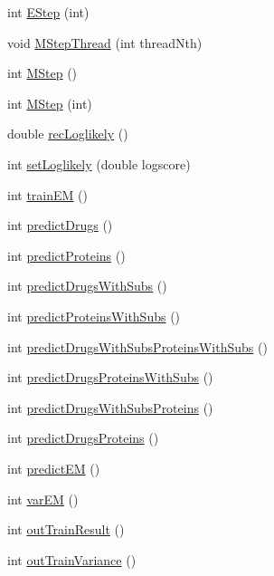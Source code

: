\begin{DoxyCompactItemize}
int \hyperlink{classgift_1_1_e_m_ac426be80fda5cc8ca36c58c6521b2325}{E\+Step} (int)
\item 
void \hyperlink{classgift_1_1_e_m_ab013e0f40fb11407d8c528ae6e34301c}{M\+Step\+Thread} (int thread\+Nth)
\item 
int \hyperlink{classgift_1_1_e_m_ab79cafeefe4ac1574990b83dfa02b762}{M\+Step} ()
\item 
int \hyperlink{classgift_1_1_e_m_aa380381fea7970d7470e40671a526a34}{M\+Step} (int)
\item 
double \hyperlink{classgift_1_1_e_m_a94cb6b1e0ee9c60c04356cd4061a6465}{rec\+Loglikely} ()
\item 
int \hyperlink{classgift_1_1_e_m_a5672958e550c66f7417ded6b846714b4}{set\+Loglikely} (double logscore)
\item 
int \hyperlink{classgift_1_1_e_m_a5a8d0678b14cb1429d37bb3ae7ca30e2}{train\+EM} ()
\item 
int \hyperlink{classgift_1_1_e_m_aed05c6829e19e981628d8a514a766cab}{predict\+Drugs} ()
\item 
int \hyperlink{classgift_1_1_e_m_aea459564b58b8f1322fb0d444ed49e7b}{predict\+Proteins} ()
\item 
int \hyperlink{classgift_1_1_e_m_a7f8463f4f7ff0acaf7e1195f5b4d58ab}{predict\+Drugs\+With\+Subs} ()
\item 
int \hyperlink{classgift_1_1_e_m_af58dd10f19c4acc73d05bc02ea45b2e0}{predict\+Proteins\+With\+Subs} ()
\item 
int \hyperlink{classgift_1_1_e_m_abb44eb68c4695bf9badf26c72f6c1ebd}{predict\+Drugs\+With\+Subs\+Proteins\+With\+Subs} ()
\item 
int \hyperlink{classgift_1_1_e_m_a22ea8f4791a6d58d8b1ffa85f49c6757}{predict\+Drugs\+Proteins\+With\+Subs} ()
\item 
int \hyperlink{classgift_1_1_e_m_a1d026fdafa17cd3237dd720dd5ce0a28}{predict\+Drugs\+With\+Subs\+Proteins} ()
\item 
int \hyperlink{classgift_1_1_e_m_a3071ab56b24724f241f98ce983d52b6e}{predict\+Drugs\+Proteins} ()
\item 
int \hyperlink{classgift_1_1_e_m_aa19dfda49bb6c06ceb4ce1efb82dcf38}{predict\+EM} ()
\item 
int \hyperlink{classgift_1_1_e_m_a8245f446986ca1a945dd6911dfad4123}{var\+EM} ()
\item 
int \hyperlink{classgift_1_1_e_m_ac6ef33c41b7c7922c5066907ce6d9820}{out\+Train\+Result} ()
\item 
int \hyperlink{classgift_1_1_e_m_ad0ef8217aff43543f4dff291120e1a06}{out\+Train\+Variance} ()
\end{DoxyCompactItemize}


